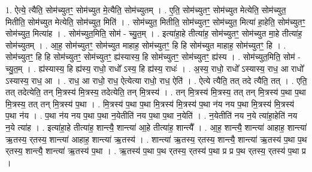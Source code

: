 \documentclass[17pt]{extarticle}
\begin{document}
1. ऐत्ये॒ त्यैति॒ सोम॑च्युतꣳ॒॒ सोम॑च्युत मे॒त्यैति॒ सोम॑च्युतम् । . ए॒ति॒ सोम॑च्युतꣳ॒॒ सोम॑च्युत मेत्येति॒ सोम॑च्युत॒ मितीति॒ सोम॑च्युत मेत्येति॒ सोम॑च्युत॒ मिति॑ । . सोम॑च्युत॒ मितीति॒ सोम॑च्युतꣳ॒॒ सोम॑च्युत॒ मित्या॑ हा॒हेति॒ सोम॑च्युतꣳ॒॒ सोम॑च्युत॒ मित्या॑ह । . सोम॑च्युत॒मिति॒ सोम॑ - च्यु॒त॒म् । . इत्या॑हा॒हे तीत्या॑ह॒ सोम॑च्युतꣳ॒॒ सोम॑च्युत मा॒हे तीत्या॑ह॒ सोम॑च्युतम् । . आ॒ह॒ सोम॑च्युतꣳ॒॒ सोम॑च्युत माहाह॒ सोम॑च्युतꣳ॒॒ हि हि सोम॑च्युत माहाह॒ सोम॑च्युतꣳ॒॒ हि । . सोम॑च्युतꣳ॒॒ हि हि सोम॑च्युतꣳ॒॒ सोम॑च्युतꣳ॒॒ ह्य॑स्यास्य॒ हि सोम॑च्युतꣳ॒॒ सोम॑च्युतꣳ॒॒ ह्य॑स्य । . सोम॑च्युत॒मिति॒ सोम॑ - च्यु॒त॒म् । . ह्य॑स्यास्य॒ हि ह्य॑स्य॒ राधो॒ राधो᳚ ऽस्य॒ हि ह्य॑स्य॒ राधः॑ । . अ॒स्य॒ राधो॒ राधो᳚ ऽस्यास्य॒ राध॒ आ राधो᳚ ऽस्यास्य॒ राध॒ आ । . राध॒ आ राधो॒ राध॒ ऐत्येत्या राधो॒ राध॒ ऐति॑ । . ऐत्ये त्यैति॒ तत् तदे त्यैति॒ तत् । . एति॒ तत् तदेत्येति॒ तन् मि॒त्रस्य॑ मि॒त्रस्य॒ तदेत्येति॒ तन् मि॒त्रस्य॑ । . तन् मि॒त्रस्य॑ मि॒त्रस्य॒ तत् तन् मि॒त्रस्य॑ प॒था प॒था मि॒त्रस्य॒ तत् तन् मि॒त्रस्य॑ प॒था । . मि॒त्रस्य॑ प॒था प॒था मि॒त्रस्य॑ मि॒त्रस्य॑ प॒था न॑य नय प॒था मि॒त्रस्य॑ मि॒त्रस्य॑ प॒था न॑य । . प॒था न॑य नय प॒था प॒था न॒येतीति॑ नय प॒था प॒था न॒येति॑ । . न॒येतीति॑ नय न॒ये त्या॑हा॒हेति॑ नय न॒ये त्या॑ह । . इत्या॑हा॒हे तीत्या॑ह॒ शान्त्यै॒ शान्त्या॑ आ॒हे तीत्या॑ह॒ शान्त्यै᳚ । . आ॒ह॒ शान्त्यै॒ शान्त्या॑ आहाह॒ शान्त्या॑ ऋ॒तस्य॒ र्‌तस्य॒ शान्त्या॑ आहाह॒ शान्त्या॑ ऋ॒तस्य॑ । . शान्त्या॑ ऋ॒तस्य॒ र्‌तस्य॒ शान्त्यै॒ शान्त्या॑ ऋ॒तस्य॑ प॒था प॒थ र्‌तस्य॒ शान्त्यै॒ शान्त्या॑ ऋ॒तस्य॑ प॒था । . ऋ॒तस्य॑ प॒था प॒थ र्‌तस्य॒ र्‌तस्य॑ प॒था प्र प्र प॒थ र्‌तस्य॒ र्‌तस्य॑ प॒था प्र । \newline
\end{document}
